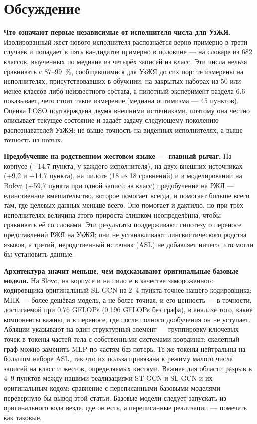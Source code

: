 \documentclass[a4paper,fleqn]{cas-dc}
\begin{document}
\hypertarget{ux43eux431ux441ux443ux436ux434ux435ux43dux438ux435}{%
\section{Обсуждение}\label{ux43eux431ux441ux443ux436ux434ux435ux43dux438ux435}}

\textbf{Что означают первые независимые от исполнителя числа для УзЖЯ.} Изолированный жест нового исполнителя распознаётся верно примерно в трети случаев и попадает в пять кандидатов примерно в половине --- на словаре из 682 классов, выученных по медиане из четырёх записей на класс. Эти числа нельзя сравнивать с 87--99~\%, сообщавшимися для УзЖЯ до сих пор: те измерены на исполнителях, присутствовавших в обучении, на закрытых наборах из 50 или менее классов либо неизвестного состава, а пилотный эксперимент раздела 6.6 показывает, чего стоит такое измерение (медиана оптимизма --- 45 пунктов). Оценка LOSO подтверждена двумя внешними источниками, поэтому она честно описывает текущее состояние и задаёт задачу следующему поколению распознавателей УзЖЯ: не выше точность на виденных исполнителях, а выше точность на новых.

\textbf{Предобучение на родственном жестовом языке --- главный рычаг.} На корпусе (+14,7 пункта, у каждого исполнителя), на двух внешних источниках (+9,2 и +14,7 пункта), на пилоте (18 из 18 сравнений) и в моделировании на Bukva (+59,7 пункта при одной записи на класс) предобучение на РЖЯ --- единственное вмешательство, которое помогает всегда, и помогает больше всего там, где целевых данных меньше всего. Оно помогает и дактилю, но при трёх исполнителях величина этого прироста слишком неопределённа, чтобы сравнивать её со словами. Эти результаты поддерживают гипотезу о переносе представлений РЖЯ на УзЖЯ; они не устанавливают лингвистического родства языков, а третий, неродственный источник (ASL) не добавляет ничего, что могли бы установить данные.

\textbf{Архитектура значит меньше, чем подсказывают оригинальные базовые модели.} На Slovo, на корпусе и на пилоте в качестве замороженного кодировщика оригинальный SL-GCN на 2--4 пункта точнее нашего кодировщика; МПК --- более дешёвая модель, а не более точная, и его ценность --- в точности, достигаемой при 0,76 GFLOPs (0,196 GFLOPs без графа), в анализе того, какие компоненты важны, и в переносе, где после полного дообучения он не уступает. Абляции указывают на один структурный элемент --- группировку ключевых точек в токены частей тела с собственными системами координат; скелетный граф можно заменить MLP по частям без потерь. Те же токены нейтральны на большом наборе ASL, так что их польза привязана к режиму малого числа записей на класс и жестов, определяемых кистями. Важнее для области разрыв в 4--9 пунктов между нашими реализациями ST-GCN и SL-GCN и их оригинальным кодом: сравнение с переписанными базовыми моделями перевернуло бы вывод этой статьи. Базовые модели следует запускать из оригинального кода везде, где он есть, а переписанные реализации --- помечать как таковые.
\end{document}
